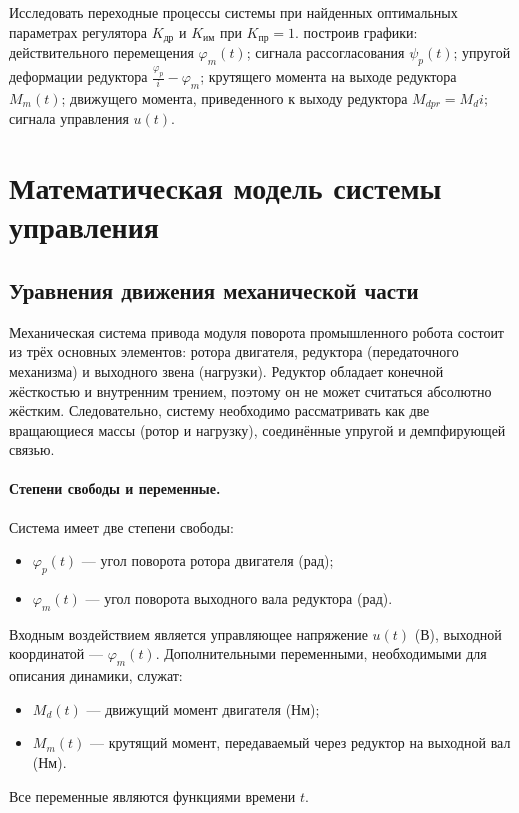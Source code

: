 \documentclass[a4paper, 14pt]{extarticle}
\begin{document}
Исследовать переходные процессы системы
при найденных оптимальных параметрах регулятора
$K_{\text{др}}$ и $K_{\text{им}}$ при $K_{\text{пр}}=1$.  построив графики: действительного перемещения $\varphi_m(t)$; сигнала рассогласования $\psi_p(t)$; упругой деформации редуктора $\frac{\varphi_p}{i}-\varphi_m$; крутящего момента на выходе редуктора $M_m(t)$; движущего момента, приведенного к выходу редуктора
$M_{dpr}=M_d i;$ сигнала управления $u(t)$.
\newpage
\section{Математическая модель системы управления}

\subsection{Уравнения движения механической части}
Механическая система привода модуля поворота промышленного робота состоит из трёх основных элементов: ротора двигателя, редуктора (передаточного механизма) и выходного звена (нагрузки). Редуктор обладает конечной жёсткостью и внутренним трением, поэтому он не может считаться абсолютно жёстким. Следовательно, систему необходимо рассматривать как две вращающиеся массы (ротор и нагрузку), соединённые упругой и демпфирующей связью.

\paragraph{Степени свободы и переменные.}
Система имеет две степени свободы:
\begin{itemize}
    \item \(\varphi_p(t)\) — угол поворота ротора двигателя (рад);
    \item \(\varphi_m(t)\) — угол поворота выходного вала редуктора (рад).
\end{itemize}
Входным воздействием является управляющее напряжение \(u(t)\) (В), выходной координатой — \(\varphi_m(t)\). Дополнительными переменными, необходимыми для описания динамики, служат:
\begin{itemize}
    \item \(M_d(t)\) — движущий момент двигателя (Нм);
    \item \(M_m(t)\) — крутящий момент, передаваемый через редуктор на выходной вал (Нм).
\end{itemize}
Все переменные являются функциями времени \(t\).
\end{document}
